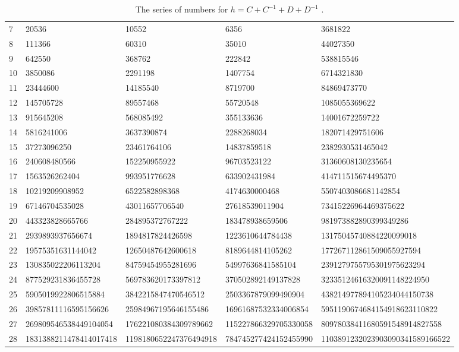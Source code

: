 \documentclass{amsart}
\theoremstyle{definition}
\begin{document}
\begin{sidewaystable}
\begin{tabular}{lllll}
7 & 20536 & 10552 & 6356 & 3681822 \\
8 & 111366 & 60310 & 35010 & 44027350 \\
9 & 642550 & 368762 & 222842 & 538815546 \\
10 & 3850086 & 2291198 & 1407754 & 6714321830 \\
11 & 23444600 & 14185540 & 8719700 & 84869473770 \\
12 & 145705728 & 89557468 & 55720548 & 1085055369622 \\
13 & 915645208 & 568085492 & 355133636 & 14001672259722 \\
14 & 5816241006 & 3637390874 & 2288268034 & 182071429751606 \\
15 & 37273096250 & 23461764106 & 14837859518 & 2382930531465042 \\
16 & 240608480566 & 152250955922 & 96703523122 & 31360608130235654 \\
17 & 1563526262404 & 993951776628 & 633902431984 & 414711515674495370 \\
18 & 10219209908952 & 6522582898368 & 4174630000468 & 5507403086681142854 \\
19 & 67146704535028 & 43011657706540 & 27618539011904 & 73415226964469375622 \\
20 & 443323828665766 & 284895372767222 & 183478938659506 & 981973882890399349286 \\
21 & 2939893937656674 & 1894817824426598 & 1223610644784438 & 13175045740884220099018 \\
22 & 19575351631144042 & 12650487642600618 & 8189644814105262 & 177267112861509055927594 \\
23 & 130835022206113204 & 84759454955281696 & 54997636841585104 & 2391279755795301975623294 \\
24 & 877529231836455728 & 569783620173397812 & 370502892149137828 & 32335124616320091148224950 \\
25 & 5905019922806515884 & 3842215847470546512 & 2503367879099490904 & 438214977894105234044150738\\
26 & 39857811116595156626 & 25984967195646155486 & 16961687532334006854 & 5951190674684154918623110822\\
27 & 269809546538449104054 & 176221080384309789662 & 115227866329705330058 & 80978038411680591548914827558\\
28 & 1831388211478414017418 & 1198180652247376494918 & 784745277424152455990 & 1103891232023903090341589166522\\
\hline
\end{tabular}
\caption{ The series of numbers for $h=C+C^{-1}+D+D^{-1}$ .}
\label{t:Case2SeriesOfNumbers}
\end{sidewaystable}
\end{document}
